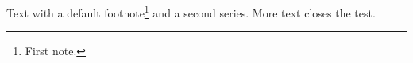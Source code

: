 \documentclass{article}
\begin{document}
Text with a default footnote\footnote{First note.} and a second series.
More text closes the test.
\end{document}
